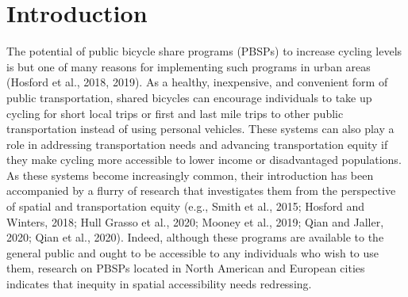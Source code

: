 \documentclass[]{elsarticle} %
\begin{document}
\newpage

\hypertarget{introduction}{%
\section{Introduction}\label{introduction}}

The potential of public bicycle share programs (PBSPs) to increase
cycling levels is but one of many reasons for implementing such programs
in urban areas (Hosford et al., 2018, 2019). As a healthy, inexpensive,
and convenient form of public transportation, shared bicycles can
encourage individuals to take up cycling for short local trips or first
and last mile trips to other public transportation instead of using
personal vehicles. These systems can also play a role in addressing
transportation needs and advancing transportation equity if they make
cycling more accessible to lower income or disadvantaged populations. As
these systems become increasingly common, their introduction has been
accompanied by a flurry of research that investigates them from the
perspective of spatial and transportation equity (e.g., Smith et al.,
2015; Hosford and Winters, 2018; Hull Grasso et al., 2020; Mooney et
al., 2019; Qian and Jaller, 2020; Qian et al., 2020). Indeed, although
these programs are available to the general public and ought to be
accessible to any individuals who wish to use them, research on PBSPs
located in North American and European cities indicates that inequity in
spatial accessibility needs redressing.
\end{document}
